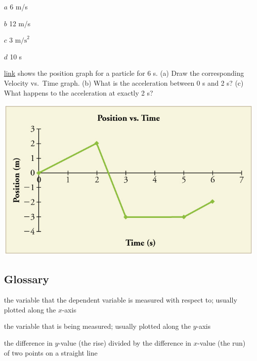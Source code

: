 \documentclass[
]{book}
\providecommand{\tightlist}{%
  \setlength{\itemsep}{0pt}\setlength{\parskip}{0pt}}
\begin{document}
\leavevmode{}%
\(a\) 6 m/s

\(b\) 12 m/s

\(c\) \(\text{3\ m/s}^{2}{}\)

\(d\) 10 s

\hypertarget{fs-id1582774}{}
\leavevmode{}%
\protect\hyperlink{import-auto-id4035681}{link} shows the
position graph for a particle for 6 s. (a) Draw the corresponding
Velocity vs.~Time graph. (b) What is the acceleration between 0 s and 2
s? (c) What happens to the acceleration at exactly 2 s?

\includegraphics{images/Figure_02_08Sol_21.jpg}

\hypertarget{glossary-5}{%
\subsection{Glossary}\label{glossary-5}}

\begin{description}
\tightlist
\item[independent variable]
the variable that the dependent variable is measured with respect
to; usually plotted along the \(x{}\)-axis
\end{description}

\begin{description}
\tightlist
\item[dependent variable]
the variable that is being measured; usually plotted along the
\(y{}\)-axis
\end{description}

\begin{description}
\tightlist
\item[slope]
the difference in \(y{}\)-value (the rise) divided by the difference
in \(x{}\)-value (the run) of two points on a straight line
\end{description}
\end{document}
